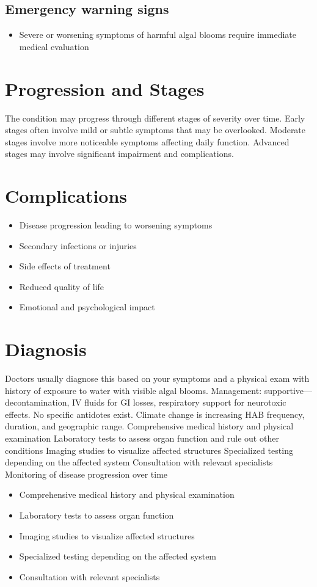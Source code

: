 \subsection{Emergency warning signs}
\begin{itemize}[noitemsep]
  \item Severe or worsening symptoms of harmful algal blooms require immediate medical evaluation
\end{itemize}
\section{Progression and Stages}
The condition may progress through different stages of severity over time. Early stages often involve mild or subtle symptoms that may be overlooked. Moderate stages involve more noticeable symptoms affecting daily function. Advanced stages may involve significant impairment and complications.
\section{Complications}
\begin{itemize}[noitemsep]
  \item Disease progression leading to worsening symptoms
  \item Secondary infections or injuries
  \item Side effects of treatment
  \item Reduced quality of life
  \item Emotional and psychological impact
\end{itemize}
\section{Diagnosis}
Doctors usually diagnose this based on your symptoms and a physical exam with history of exposure to water with visible algal blooms. Management: supportive---decontamination, IV fluids for GI losses, respiratory support for neurotoxic effects. No specific antidotes exist. Climate change is increasing HAB frequency, duration, and geographic range. Comprehensive medical history and physical examination Laboratory tests to assess organ function and rule out other conditions Imaging studies to visualize affected structures Specialized testing depending on the affected system Consultation with relevant specialists Monitoring of disease progression over time

\begin{itemize}[noitemsep]
  \item Comprehensive medical history and physical examination
  \item Laboratory tests to assess organ function
  \item Imaging studies to visualize affected structures
  \item Specialized testing depending on the affected system
  \item Consultation with relevant specialists
\end{itemize}
